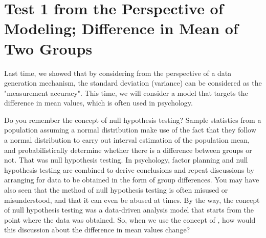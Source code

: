 \documentclass{ltjsbook}
\begin{document}
\chapter{Test 1 from the Perspective of Modeling; Difference in Mean of Two Groups}
\label{x19_modeling1}
Last time, we showed that by considering from the perspective of a data generation mechanism, the standard deviation (variance) can be considered as the "measurement accuracy".
This time, we will consider a model that targets the difference in mean values, which is often used in psychology.

Do you remember the concept of null hypothesis testing? Sample statistics from a population assuming a normal distribution make use of the fact that they follow a normal distribution to carry out interval estimation of the population mean, and probabilistically determine whether there is a difference between groups or not. That was null hypothesis testing.
In psychology, factor planning and null hypothesis testing are combined to derive conclusions and repeat discussions by arranging for data to be obtained in the form of group differences. You may have also seen that the method of null hypothesis testing is often misused or misunderstood, and that it can even be abused at times.
By the way, the concept of null hypothesis testing was a data-driven analysis model that starts from the point where the data was obtained. So, when we use the concept of , how would this discussion about the difference in mean values change?
\end{document}
